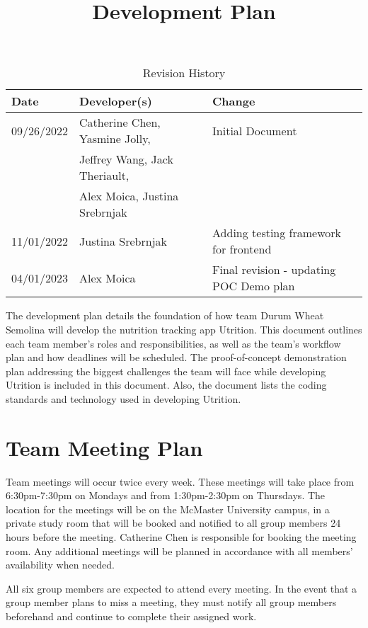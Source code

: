 \documentclass{article}
\title{Development Plan\\\progname}
\author{\authname}
\date{}
\begin{document}
\maketitle

\begin{table}[hp]
\caption{Revision History} \label{TblRevisionHistory}
\begin{tabularx}{\textwidth}{llX}
\toprule
\textbf{Date} & \textbf{Developer(s)} & \textbf{Change}\\
\midrule
09/26/2022 & Catherine Chen, Yasmine Jolly, &Initial Document\\ 
&Jeffrey Wang, Jack Theriault, &\\
&Alex Moica, Justina Srebrnjak &\\
11/01/2022 & Justina Srebrnjak &Adding testing framework for frontend\\ 
04/01/2023 & Alex Moica &Final revision - updating POC Demo plan\\ 
\bottomrule
\end{tabularx}
\end{table}

\newpage

The development plan details the foundation of how team Durum Wheat Semolina will develop the nutrition tracking app Utrition. This document outlines each team member’s roles and responsibilities, as well as the team’s workflow plan and how deadlines will be scheduled. The proof-of-concept demonstration plan addressing the biggest challenges the team will face while developing Utrition is included in this document. Also, the document lists the coding standards and technology used in developing Utrition.

\section{Team Meeting Plan}

Team meetings will occur twice every week. These meetings will take place from 6:30pm-7:30pm on Mondays and from 1:30pm-2:30pm on Thursdays. The location for the meetings will be on the McMaster University campus, in a private study room that will be booked and notified to all group members 24 hours before the meeting. Catherine Chen is responsible for booking the meeting room. Any additional meetings will be planned in accordance with all members'  availability when needed.

All six group members are expected to attend every meeting. In the event that a group member plans to miss a meeting, they must notify all group members beforehand and continue to complete their assigned work.
\end{document}
